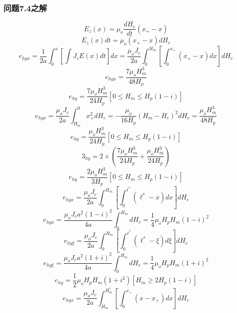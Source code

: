 \subsubsection{问题7.4之解}
\begin{equation}%
E_z(x)=\mu_o\frac{dH_e}{dt}(x_+-x)
\end{equation}
\begin{equation}%
E_z(x)dt=\mu_o(x_+-x)dH_e
\end{equation}
\begin{equation}%
e_{hyx}=\frac{1}{2a}\int_{0}^{a}\left[\int J_cE(x)dt\right]dx
=\frac{\mu_oJ_c}{2a}\int_{0}^{H_m}\left[\int_{0}^{x_+}(x_+-x)dx\right]dH_e
\end{equation}
\begin{equation}%
e_{hyx}=\frac{7\mu_oH_{m}^{3}}{48H_p}
\end{equation}
\begin{equation}%
e_{hy}=\frac{7\mu_oH_{m}^{3}}{24H_p}      [0\leq H_m\leq H_p(1-i)]
\end{equation}
\begin{equation}%
e_{hyx}=\frac{\mu_oJ_c}{2a}\int_{H_m}^{0}x_{+}^{2}dH_e=-\frac{\mu_o}{16H_p}(H_m-H_e)^2dH_e 
=\frac{\mu_oH_{m}^{3}}{48H_p}
\end{equation}
\begin{equation}%
e_{hy}=\frac{\mu_oH_{m}^{3}}{24H_p}        [0\leq H_m\leq H_p(1-i)]
\end{equation}
\begin{equation}%
3_{hy}=2\times\left(\frac{7\mu_oH_{m}^{3}}{24H_p}+\frac{\mu_oH_{m}^{3}}{24H_p}\right)
\end{equation}
\begin{equation}%
e_{hy}=\frac{2\mu_oH_{m}^{3}}{3H_p}         [0\leq H_m\leq H_p(1-i)]
\end{equation}
\begin{equation}%
e_{hyx}=\frac{\mu_oJ_c}{2a}\int_{0}^{H_m}\left[\int_{0}^{\ell^*}(\ell^*-x)dx\right]dH_e
\end{equation}
\begin{equation}%
e_{hyx}=\frac{\mu_oJ_ca^2(1-i)^2}{4a}\int_{0}^{H_m}dH_e=\frac{1}{4}\mu_oH_pH_m(1-i)^2
\end{equation}
\begin{equation}%
e_{hy\xi}=\frac{\mu_oJ_c}{2a}\int_{0}^{H_m}\left[\int_{0}^{\ell^*}(\ell^*-\xi)d\xi\right]dH_e
\end{equation}
\begin{equation}%
e_{hy\xi}=\frac{\mu_oJ_ca^2(1+i)^2}{4a}\int_{0}^{H_m}dH_e=\frac{1}{4}\mu_oH_pH_m(1+i)^2
\end{equation}
\begin{equation}%
e_{hy}=\frac{1}{2}\mu_oH_pH_m(1+i^2)    [H_m\geq 2H_p(1-i)]
\end{equation}
\begin{equation}%
e_{hyx}=\frac{\mu_oJ_c}{2a}\int_{H_m}^{H_{m}^{*}}\left[\int_{0}^{x_+}(x-x_+)dx\right]dH_e
\end{equation}


